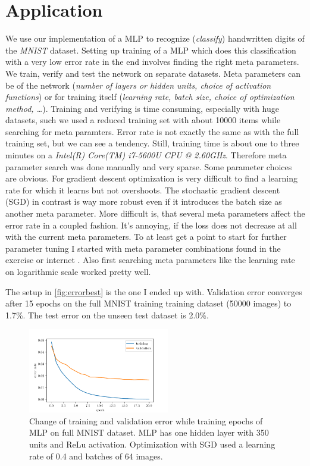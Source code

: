 \documentclass[a4paper,11pt]{article}
\begin{document}
\section{Application}

We use our implementation of a MLP to recognize (\emph{classify})
handwritten digits of the \emph{MNIST} dataset.
Setting up training of a MLP which does this classification with a very low
error rate in the end involves finding the right meta parameters.
We train, verify and test the network on separate datasets.
Meta parameters can be of the network (\emph{number of layers or hidden units,
  choice of activation functions}) or for training itself (\emph{learning rate,
  batch size, choice of optimization method, \dots}).
Training and verifying is time consuming, especially with huge datasets,
such we used a reduced training set with about 10000 items while searching for meta paramters.
Error rate is not exactly the same as with the full training set,
but we can see a tendency.
Still, training time is about one to three minutes on a \emph{Intel(R) Core(TM)
  i7-5600U CPU @ 2.60GHz}. Therefore meta parameter search was done manually
and very sparse.
Some parameter choices are obvious.
For gradient descent optimization is very difficult to
find a learning rate for which it learns but not overshoots. The stochastic
gradient descent (SGD) in contrast is way more robust even if it introduces the batch
size as another meta parameter.
More difficult is, that several meta parameters affect the error rate in a
coupled fashion.
It's annoying, if the loss does not decrease at all with the current meta parameters.
To at least get a point to start for further parameter tuning
I started with meta parameter combinations found in the exercise or internet
\cite{deeplearningorg}. Also first searching meta parameters like the learning rate
on logarithmic scale worked pretty well.

The setup in \autoref{fig:errorbest} is the one I ended up with.
Validation error converges after 15 epochs on the full MNIST training training
dataset (50000 images) to 1.7\%.
The test error on the unseen test dataset is 2.0\%.

\begin{figure}[ht]
  \centering \includegraphics[width=0.55\textwidth]{assets/error_best.pdf}
  \caption{
    \label{fig:errorbest}
    Change of training and validation error while training epochs of MLP on full
    MNIST dataset. MLP has one hidden layer with 350 units and ReLu activation.
    Optimization with SGD used a learning rate of 0.4 and batches of 64 images.
  }
\end{figure}
\end{document}
